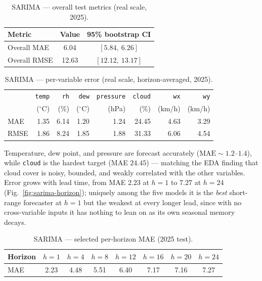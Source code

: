 \documentclass[12pt,a4paper,oneside]{report}
\begin{document}
\begin{table}[H]\centering
\caption{SARIMA --- overall test metrics (real scale, 2025).}
\label{tab:res-sarima}
\begin{tabular}{lcc}
\toprule
\textbf{Metric} & \textbf{Value} & \textbf{95\% bootstrap CI} \\
\midrule
Overall MAE  & 6.04  & $[5.84,\ 6.26]$ \\
Overall RMSE & 12.63 & $[12.12,\ 13.17]$ \\
\bottomrule
\end{tabular}
\end{table}

\begin{table}[H]\centering
\caption{SARIMA --- per-variable error (real scale, horizon-averaged, 2025).}
\label{tab:sarima-pervar}
\begin{tabular}{lrrrrrrr}
\toprule
 & \texttt{temp} & \texttt{rh} & \texttt{dew} & \texttt{pressure} & \texttt{cloud} & \texttt{wx} & \texttt{wy} \\
 & ($^\circ$C) & (\%) & ($^\circ$C) & (hPa) & (\%) & (km/h) & (km/h) \\
\midrule
MAE  & 1.35 & 6.14 & 1.20 & 1.24 & 24.45 & 4.63 & 3.29 \\
RMSE & 1.86 & 8.24 & 1.85 & 1.88 & 31.33 & 6.06 & 4.54 \\
\bottomrule
\end{tabular}
\end{table}

Temperature, dew point, and pressure are forecast accurately ($\text{MAE}\sim1.2$--$1.4$),
while \texttt{cloud} is the hardest target (MAE $24.45$) --- matching the EDA
finding that cloud cover is noisy, bounded, and weakly correlated with the other
variables. Error grows with lead time, from MAE $2.23$ at $h{=}1$ to $7.27$ at
$h{=}24$ (Fig.~\ref{fig:sarima-horizon}); uniquely among the five models it is the
\emph{best} short-range forecaster at $h{=}1$ but the weakest at every longer
lead, since with no cross-variable inputs it has nothing to lean on as its own
seasonal memory decays.

\begin{table}[H]\centering
\caption{SARIMA --- selected per-horizon MAE (2025 test).}
\label{tab:sarima-horizon}
\begin{tabular}{lccccccc}
\toprule
Horizon & $h{=}1$ & $h{=}4$ & $h{=}8$ & $h{=}12$ & $h{=}16$ & $h{=}20$ & $h{=}24$ \\
\midrule
MAE & 2.23 & 4.48 & 5.51 & 6.40 & 7.17 & 7.16 & 7.27 \\
\bottomrule
\end{tabular}
\end{table}
\end{document}
